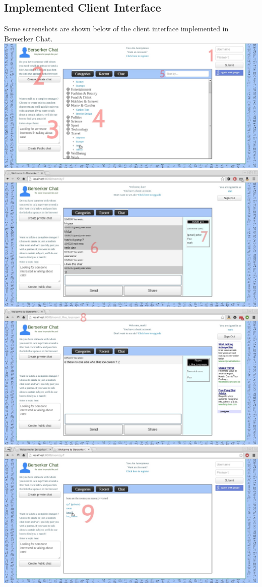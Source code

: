 \documentclass{sig-alt-release2}
\begin{document}
\subsection{Implemented Client Interface}

Some screenshots are shown below of the client interface implemented in Berserker Chat.\\

\includegraphics[scale=0.26]{categories-browsing_1.jpg}
\includegraphics[scale=0.26]{chat-user_2.jpg}
\includegraphics[scale=0.26]{public-joined_3.jpg}
\includegraphics[scale=0.26]{recent_4.jpg}
\end{document}
